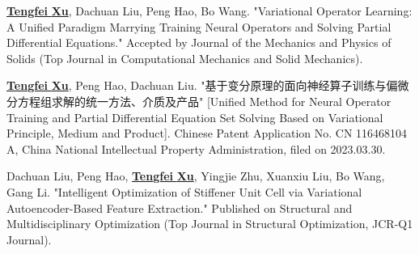 

\begin{cvitems}
  \item {\color{red} \ul{\textbf{Tengfei} \textbf{Xu}}}, Dachuan Liu, Peng Hao, Bo Wang. "Variational Operator Learning: A Unified Paradigm Marrying Training Neural Operators and Solving Partial Differential Equations." Accepted by Journal of the Mechanics and Physics of Solids (Top Journal in Computational Mechanics and Solid Mechanics). 
  \item {\color{red} \ul{\textbf{Tengfei} \textbf{Xu}}}, Peng Hao, Dachuan Liu. "基于变分原理的面向神经算子训练与偏微分方程组求解的统一方法、介质及产品" [Unified Method for Neural Operator Training and Partial Differential Equation Set Solving Based on Variational Principle, Medium and Product]. Chinese Patent Application No. CN 116468104 A, China National Intellectual Property Administration, filed on 2023.03.30.
  \item Dachuan Liu, Peng Hao, {\color{red} \ul{\textbf{Tengfei} \textbf{Xu}}}, Yingjie Zhu, Xuanxiu Liu, Bo Wang, Gang Li. "Intelligent Optimization of Stiffener Unit Cell via Variational Autoencoder-Based Feature Extraction." Published on Structural and Multidisciplinary Optimization (Top Journal in Structural Optimization, JCR-Q1 Journal).  
\end{cvitems}